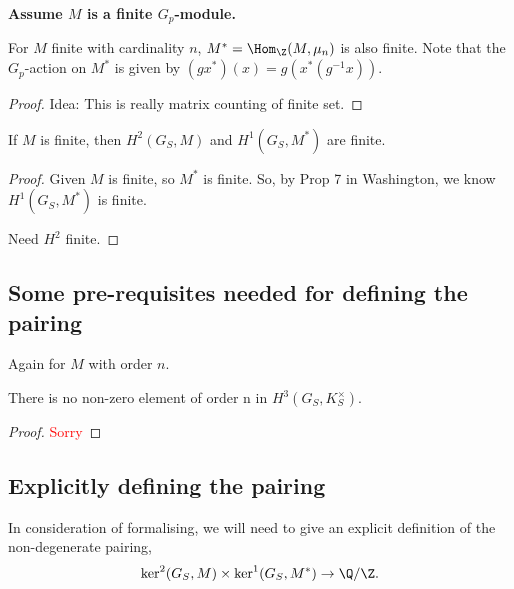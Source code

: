 \documentclass[11pt]{article}
\begin{document}
\bigskip
\textbf{Assume $M$ is a finite $G_p$-module.}

\begin{lem}
    For $M$ finite with cardinality $n$, $M^* = \Hom_\Z (M, \mu_n)$ is also finite. Note that the $G_p$-action on $M^*$ is given by $(g x^*)(x) = g(x^* (g^{-1}x))$.
\end{lem}

\begin{proof}
    Idea: This is really matrix counting of finite set.
\end{proof}

\begin{lem}
    If $M$ is finite, then $H^2(G_S, M)$ and $H^1 (G_S, M^*)$ are finite.
\end{lem}

\begin{proof}
    Given $M$ is finite, so $M^*$ is finite. So, by Prop 7 in Washington, we know $H^1 (G_S, M^*)$ is finite.

    \bigskip
    Need $H^2$ finite.
\end{proof}

\subsection{Some pre-requisites needed for defining the pairing}
Again for $M$ with order $n$.
\begin{lem} \label{lem:H3-n-torsion-trivial }
 There is no non-zero element of order n in $H^3 (G_S, K_S^\times)$.
\end{lem}

\begin{proof}
    \textcolor{red}{Sorry}
\end{proof}

\subsection{Explicitly defining the pairing}


In consideration of formalising, we will need to give an explicit definition of the non-degenerate pairing,
\[
\ker^2 (G_S, M) \times \ker^1 (G_S, M^*) \to \Q/\Z.
\]
\end{document}
